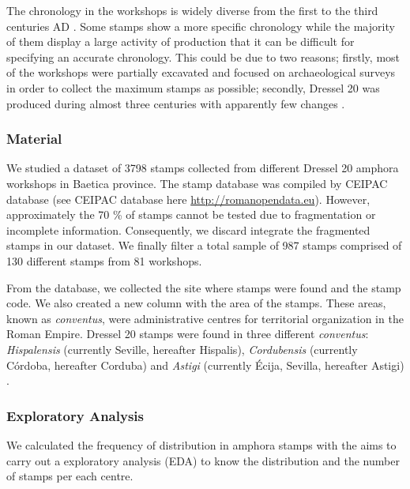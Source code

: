 \documentclass[review]{elsarticle}
\begin{document}
The chronology in the workshops is widely diverse from the first to the third centuries AD \citep{millet_anforas_1998,rodriguez_baetican_1998,chic2005comercio}. Some stamps show a more specific chronology while the majority of them display a large activity of production that it can be difficult for specifying an accurate chronology. This could be due to two reasons; firstly, most of the workshops were partially excavated and focused on archaeological surveys in order to collect the maximum stamps as possible; secondly, Dressel 20 was produced during almost three centuries with apparently few changes \citep{berni_piero_chapter_2017}.

\subsubsection{Material}
 
We studied a dataset of 3798 stamps collected from different Dressel 20 amphora workshops in Baetica province. The stamp database was compiled by CEIPAC database \citep{remesal_centro_2015} (see CEIPAC database here \url{http://romanopendata.eu}). However, approximately the 70 \% of stamps cannot be tested due to fragmentation or incomplete information. Consequently, we discard integrate the fragmented stamps in our dataset. We finally filter a total sample of 987 stamps comprised of 130 different stamps from 81 workshops. 



From the database, we collected the site where stamps were found and the stamp code. We also created a new column with the area of the stamps. These areas, known as \textit{conventus}, were administrative centres for territorial organization in the Roman Empire. Dressel 20 stamps were found in three different \textit{conventus}: \textit{Hispalensis} (currently Seville, hereafter Hispalis), \textit{Cordubensis} (currently C\'ordoba, hereafter Corduba) and \textit{Astigi} (currently Écija, Sevilla, hereafter Astigi) \citep{rodriguez_economioleicola_1977,
chicdatos2001,berni_millet_epigrafianforica_2008} .


\subsubsection{Exploratory Analysis}

We calculated the frequency of distribution in amphora stamps with the aims to carry out a exploratory analysis (EDA) to know the distribution and the number of stamps per each centre.  
\end{document}
